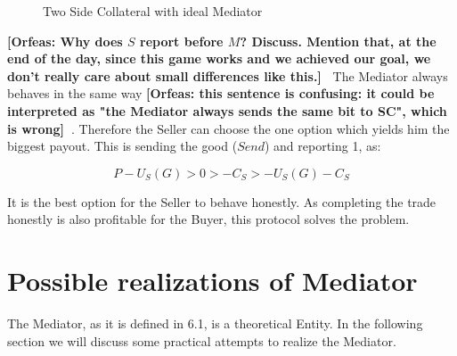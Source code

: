 \documentclass{cacthesis}
\newcommand{\authnote}[3]{{ \footnotesize \textbf{#1[#2: #3]~}}}
\newcommand{\orfnote}[1]{\authnote{\color{blue}}{Orfeas}{#1}}
\begin{document}
\begin{figure}[htb!]
    \centering
    \caption{Two Side Collateral with ideal Mediator}
\end{figure}

\orfnote{Why does $S$ report before $M$? Discuss. Mention that, at the end of
the day, since this game works and we achieved our goal, we don't really care
about small differences like this.}
The Mediator always behaves in the same way
\orfnote{this sentence is confusing: it could be interpreted as "the Mediator
always sends the same bit to SC", which is wrong}. Therefore the Seller can
choose the one option which yields him the biggest payout. This is sending the good ($Send$) and reporting 1, as: 

\[P-U_S(G)>0>-C_S>-U_S(G) - C_S\]

It is the best option for the Seller to behave honestly.\newline
As completing the trade honestly is also profitable for the Buyer, this protocol solves the problem.


\section{Possible realizations of Mediator}
The Mediator, as it is defined in 6.1, is a theoretical Entity. In the following section we will discuss some practical attempts to realize the Mediator.
\end{document}
